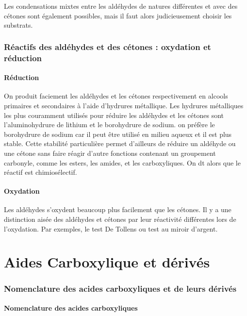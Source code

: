Les condensations mixtes entre les aldéhydes de natures différentes et avec des cétones sont également possibles, mais il faut alors judicieusement choisir les substrats.

\section{Réactifs des aldéhydes et des cétones : oxydation et réduction}

\subsection{Réduction}
On produit faciement les aldéhydes et les cétones respectivement en alcools primaires et secondaires à l'aide d'hydrures métallique.
Les hydrures métalliques les plus couramment utilisés pour réduire les aldéhydes et les cétones sont l'aluminohydrure de lithium et le borohydrure de sodium.
on préfère le borohydrure de sodium car il peut être utilisé en milieu aqueux et il est plus stable.
Cette stabilité particulière permet d'ailleurs de réduire un aldéhyde ou une cétone sans faire réagir d'autre fonctions contenant un groupement carbonyle, comme les esters, les amides, et les carboxyliques.
On dt alors que le réactif est chimiosélectif.

\subsection{Oxydation}
Les aldéhydes s'oxydent beaucoup plus facilement que les cétones.
Il y a une distinction aisée des aldéhydes et cétones par leur réactivité différentes lors de l'oxydation.
Par exemples, le test De Tollens ou test au miroir d'argent.



\part{Aides Carboxylique et dérivés}

\section{Nomenclature des acides carboxyliques et de leurs dérivés }

\subsection{Nomenclature des acides carboxyliques}

